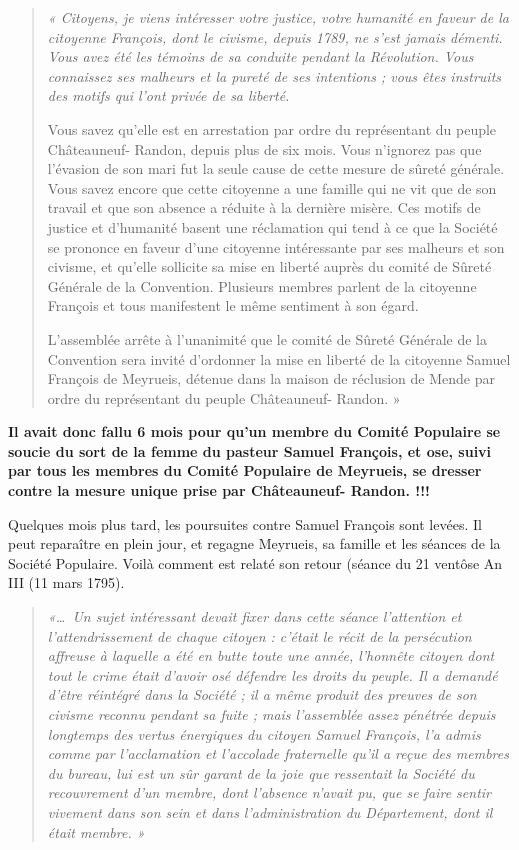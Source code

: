 \begin{quote}
\itshape
« Citoyens, je viens intéresser votre justice, votre humanité en faveur de la citoyenne
François, dont le civisme, depuis 1789, ne s’est jamais démenti. Vous avez été les témoins de
sa conduite pendant la Révolution. Vous connaissez ses malheurs et la pureté de ses
intentions ; vous êtes instruits des motifs qui l’ont privée de sa liberté.

Vous savez qu’elle est en arrestation par ordre du représentant du peuple Châteauneuf-
Randon, depuis plus de six mois. Vous n’ignorez pas que l’évasion de son mari fut la seule
cause de cette mesure de sûreté générale. Vous savez encore que cette citoyenne a une
famille qui ne vit que de son travail et que son absence a réduite à la dernière misère. Ces
motifs de justice et d’humanité basent une réclamation qui tend à ce que la Société se
prononce en faveur d’une citoyenne intéressante par ses malheurs et son civisme, et qu’elle
sollicite sa mise en liberté auprès du comité de Sûreté Générale de la Convention. Plusieurs
membres parlent de la citoyenne François et tous manifestent le même sentiment à son égard.

L’assemblée arrête à l’unanimité que le comité de Sûreté Générale de la Convention sera
invité d’ordonner la mise en liberté de la citoyenne Samuel François de Meyrueis, détenue
dans la maison de réclusion de Mende par ordre du représentant du peuple Châteauneuf-
Randon. »
\end{quote}


\textbf{Il avait donc fallu 6 mois pour qu’un membre du Comité Populaire se soucie du sort de
la femme du pasteur Samuel François, et ose, suivi par tous les membres du Comité
Populaire de Meyrueis, se dresser contre la mesure unique prise par Châteauneuf-
Randon. !!!}

Quelques mois plus tard, les poursuites contre Samuel François sont levées. Il peut reparaître
en plein jour, et regagne Meyrueis, sa famille et les séances de la Société Populaire. Voilà
comment est relaté son retour (séance du 21 ventôse An III (11 mars 1795).

\begin{quote}
\itshape
«\ldots\ Un sujet intéressant devait fixer dans cette séance l’attention et l’attendrissement de
chaque citoyen : c’était le récit de la persécution affreuse à laquelle a été en butte toute une
année, l’honnête citoyen dont tout le crime était d’avoir osé défendre les droits du peuple. Il a
demandé d’être réintégré dans la Société ; il a même produit des preuves de son civisme
reconnu pendant sa fuite ; mais l’assemblée assez pénétrée depuis longtemps des vertus
énergiques du citoyen Samuel François, l’a admis comme par l’acclamation et l’accolade
fraternelle qu’il a reçue des membres du bureau, lui est un sûr garant de la joie que ressentait
la Société du recouvrement d’un membre, dont l’absence n’avait pu, que se faire sentir
vivement dans son sein et dans l’administration du Département, dont il était membre. »
\end{quote}

